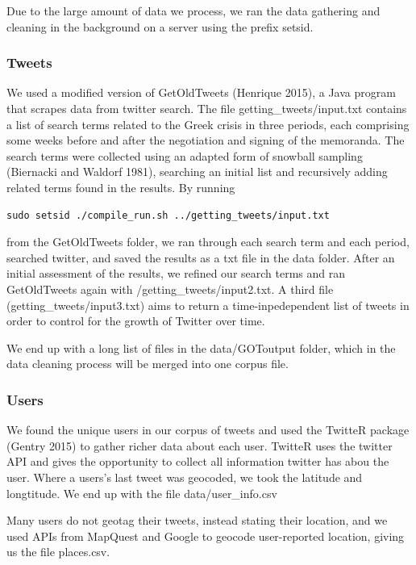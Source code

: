 \documentclass[]{article}
\begin{document}
Due to the large amount of data we process, we ran the data gathering
and cleaning in the background on a server using the prefix setsid.

\subsubsection{Tweets}\label{tweets}

We used a modified version of GetOldTweets (Henrique 2015), a Java
program that scrapes data from twitter search. The file
getting\_tweets/input.txt contains a list of search terms related to the
Greek crisis in three periods, each comprising some weeks before and
after the negotiation and signing of the memoranda. The search terms
were collected using an adapted form of snowball sampling (Biernacki and
Waldorf 1981), searching an initial list and recursively adding related
terms found in the results. By running

\begin{verbatim}
sudo setsid ./compile_run.sh ../getting_tweets/input.txt
\end{verbatim}

from the GetOldTweets folder, we ran through each search term and each
period, searched twitter, and saved the results as a txt file in the
data folder. After an initial assessment of the results, we refined our
search terms and ran GetOldTweets again with
/getting\_tweets/input2.txt. A third file (getting\_tweets/input3.txt)
aims to return a time-inpedependent list of tweets in order to control
for the growth of Twitter over time.

We end up with a long list of files in the data/GOToutput folder, which
in the data cleaning process will be merged into one corpus file.

\subsubsection{Users}\label{users}

We found the unique users in our corpus of tweets and used the TwitteR
package (Gentry 2015) to gather richer data about each user. TwitteR
uses the twitter API and gives the opportunity to collect all
information twitter has abou the user. Where a users's last tweet was
geocoded, we took the latitude and longtitude. We end up with the file
data/user\_info.csv

Many users do not geotag their tweets, instead stating their location,
and we used APIs from MapQuest and Google to geocode user-reported
location, giving us the file places.csv.
\end{document}
